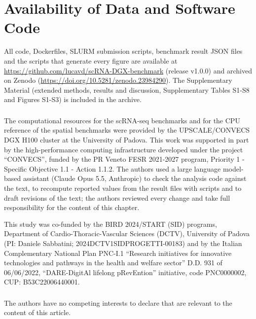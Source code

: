 \documentclass[runningheads]{llncs}
\begin{document}
\hypertarget{availability-of-data-and-software-code}{%
\section{Availability of Data and Software Code}\label{availability-of-data-and-software-code}}

All code, Dockerfiles, SLURM submission scripts, benchmark result JSON files and the scripts that generate every figure are available at \url{https://github.com/lucavd/scRNA-DGX-benchmark} (release v1.0.0) and archived on Zenodo (\url{https://doi.org/10.5281/zenodo.23984290}). The Supplementary Material (extended methods, results and discussion, Supplementary Tables S1-S8 and Figures S1-S3) is included in the archive.

\begin{credits}
\subsubsection{\ackname} The computational resources for the scRNA-seq benchmarks and for the CPU reference of the spatial benchmarks were provided by the
UPSCALE/CONVECS DGX H100 cluster at the University of Padova. This work was supported in part by the high-performance computing infrastructure developed under the project ``CONVECS'', funded by the PR Veneto FESR 2021-2027 program, Priority 1 - Specific Objective 1.1 - Action 1.1.2. The authors used a large language model-based assistant (Claude Opus 5.5, Anthropic) to check the analysis code against the text, to recompute reported values from the result files with scripts and to draft revisions of the text; the authors reviewed every change and take full responsibility for the content of this chapter.

This study was co-funded by the BIRD 2024/START (SID) programs, Department of Cardio-Thoracic-Vascular Sciences (DCTV), University of Padova (PI: Daniele Sabbatini; 2024DCTV1SIDPROGETTI-00183) and by the Italian Complementary National Plan PNC-I.1 ``Research initiatives for innovative technologies and pathways in the health and welfare sector'' D.D. 931 of 06/06/2022, ``DARE-DigitAl lifelong pRevEntion'' initiative, code PNC0000002, CUP: B53C22006440001.

\subsubsection{\discintname} The authors have no competing interests to declare that are relevant to the content of this article.
\end{credits}



\end{document}
